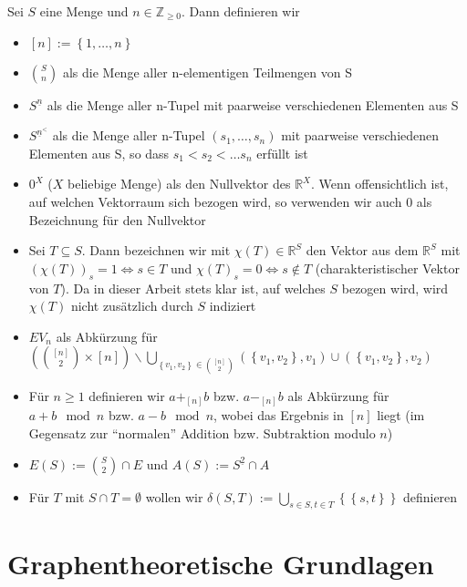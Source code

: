 \documentclass[10p,a4paper,BCOR = 12mm, DIV=15]{scrbook}
\begin{document}
\begin{Def}
Sei $S$ eine Menge und $n\in\mathbb{Z}_{\geq 0}$. Dann definieren wir
\begin{itemize}
\item $\left[n\right] := \left\{1, \ldots, n\right\}$
\item $S \choose n$ als die Menge aller n-elementigen Teilmengen von S
\item $S^{\underline{n}}$ als die Menge aller n-Tupel mit paarweise verschiedenen Elementen aus S
\item $S^{\underline{n}^<}$ als die Menge aller n-Tupel $\left(s_1, \ldots, s_n\right)$ mit paarweise verschiedenen Elementen aus S, so dass $s_1 < s_2 < \ldots s_n$ erfüllt ist
\item $0^X$ ($X$ beliebige Menge) als den Nullvektor des $\mathbb{R}^X$. Wenn offensichtlich ist, auf welchen Vektorraum sich bezogen wird, so verwenden wir auch $0$ als Bezeichnung für den Nullvektor
\item Sei $T \subseteq S$. Dann bezeichnen wir mit $\chi\left(T\right) \in \mathbb{R}^{S}$ den Vektor aus dem $\mathbb{R}^{S}$ mit $\left(\chi\left(T\right)\right)_s = 1 \Leftrightarrow s \in T$ und ${\chi\left(T\right)}_s = 0 \Leftrightarrow s \notin T$ (charakteristischer Vektor von $T$). Da in dieser Arbeit stets klar ist, auf welches $S$ bezogen wird, wird $\chi\left(T\right)$ nicht zusätzlich durch $S$ indiziert
\item $EV_n$ als Abkürzung für $\left({[n]\choose 2} \times [n]\right) \backslash \bigcup\limits_{\left\{v_1, v_2\right\} \in {[n]\choose 2}} \left(\left\{v_1, v_2\right\}, v_1\right) \cup \left(\left\{v_1, v_2\right\}, v_2\right)$
\item Für $n \geq 1$ definieren wir $a +_{\left[n\right]} b$ bzw. $a  -_{\left[n\right]} b$ als Abkürzung für $a + b \mod n$ bzw. $a - b \mod n$, wobei das Ergebnis in $\left[n\right]$ liegt (im Gegensatz zur "`normalen"' Addition bzw. Subtraktion modulo $n$)
\item $E \left(S\right) := {S \choose 2} \cap E$ und $A\left(S\right) := S^{\underline{2}} \cap A$
\item Für $T$ mit $S \cap T = \emptyset$ wollen wir $\delta\left(S, T\right) := \bigcup_{s \in S, t \in T} \left\{\left\{s, t\right\}\right\}$ definieren
\end{itemize}
\end{Def}

\section{Graphentheoretische Grundlagen}
\end{document}
